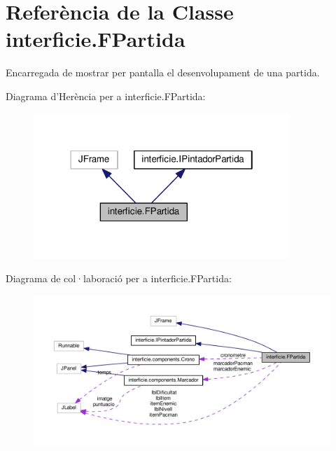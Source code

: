 \hypertarget{classinterficie_1_1_f_partida}{\section{Referència de la Classe interficie.\+F\+Partida}
\label{classinterficie_1_1_f_partida}
}


Encarregada de mostrar per pantalla el desenvolupament de una partida.  




Diagrama d'Herència per a interficie.\+F\+Partida\+:
\nopagebreak
\begin{figure}[H]
\begin{center}
\leavevmode
\includegraphics[width=274pt]{classinterficie_1_1_f_partida__inherit__graph}
\end{center}
\end{figure}


Diagrama de col·laboració per a interficie.\+F\+Partida\+:
\nopagebreak
\begin{figure}[H]
\begin{center}
\leavevmode
\includegraphics[width=350pt]{classinterficie_1_1_f_partida__coll__graph}
\end{center}
\end{figure}
